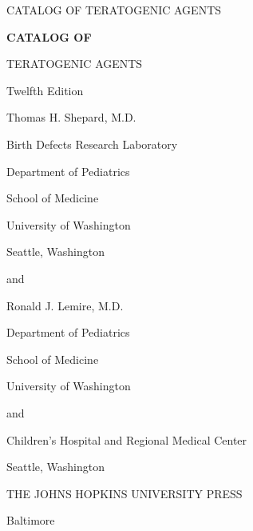 
\setcounter{page}{1}


\thispagestyle{empty}
\begingroup
\parindent0pt
\sffamily\LARGE\selectfont\relax
\vspace*{56pt}  %
CATALOG OF TERATOGENIC AGENTS
\endgroup
\clearemptydoublepage


\thispagestyle{empty}
\begingroup
\parindent0pt
{\sffamily\HUGE\bfseries\selectfont
\vspace*{34pt}  %
 CATALOG OF

 TERATOGENIC AGENTS

}


\vspace*{2pc}
\Large
Twelfth Edition

\vspace*{3pc}
{\sffamily\mediumHUGE\selectfont
Thomas H. Shepard, M.D.

}
\vspace*{1pc}
\large
Birth Defects Research Laboratory

Department of Pediatrics

School of Medicine

University of Washington

Seattle, Washington

\vspace*{1pc}

and

\vspace*{1pc}

{\sffamily\mediumHUGE\selectfont
Ronald J. Lemire, M.D.

}
\vspace*{1pc}
\large
Department of Pediatrics

School of Medicine

University of Washington

and

Children's Hospital and Regional Medical Center

Seattle, Washington

\vspace*{3pc}
{\sffamily\Large
THE JOHNS HOPKINS  UNIVERSITY  PRESS

\vspace{2pt}
Baltimore

}
\endgroup

